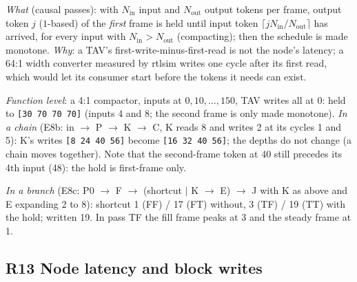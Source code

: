 \documentclass[10pt,a4paper]{article}
\newcommand{\code}[1]{\texttt{#1}}
\begin{document}
\emph{What} (causal passes): with $N_{\mathrm{in}}$ input and $N_{\mathrm{out}}$ output
tokens per frame, output token $j$ ($1$-based) of the \emph{first} frame is held until
input token $\lceil j N_{\mathrm{in}}/N_{\mathrm{out}}\rceil$ has arrived, for every
input with $N_{\mathrm{in}}>N_{\mathrm{out}}$ (compacting); then the schedule is made
monotone. \emph{Why}: a TAV's first-write-minus-first-read is not the node's latency;
a 64:1 width converter measured by rtlsim writes one cycle after its first read,
which would let its consumer start before the tokens it needs can exist.

\emph{Function level}: a 4:1 compactor, inputs at $0,10,\dots,150$, TAV writes all
at 0: held to \code{[30 70 70 70]} (inputs 4 and 8; the second frame is only made
monotone). \emph{In a chain} (E8b: in $\to$ P $\to$ K $\to$ C, K reads 8 and writes 2
at its cycles 1 and 5): K's writes \code{[8 24 40 56]} become \code{[16 32 40 56]}; the
depths do not change (a chain moves together). Note that the second-frame token at 40
still precedes its 4th input (48): the hold is first-frame only.

\emph{In a branch} (E8c: P0 $\to$ F $\to$ (shortcut $|$ K $\to$ E) $\to$ J with K as above and E
expanding 2 to 8): shortcut 1 (FF) / 17 (FT) without, 3 (TF) / 19 (TT) with the hold;
written 19. In pass TF the fill frame peaks at 3 and the steady frame at 1.

\subsection{R13 Node latency and block writes}
\end{document}
